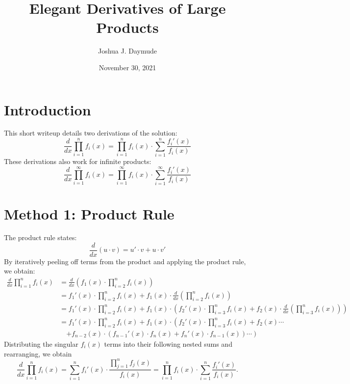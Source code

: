 \documentclass[10pt]{article}
\title{Elegant Derivatives of Large Products}
\author{Joshua J. Daymude}
\date{November 30, 2021}
\begin{document}
\thispagestyle{firststyle}

\maketitle




\section*{Introduction}

This short writeup details two derivations of the solution:
\[\frac{d}{dx}\prod_{i=1}^n f_i(x) = \prod_{i=1}^n f_i(x) \cdot \sum_{i=1}^n \frac{f_i'(x)}{f_i(x)}\]
These derivations also work for infinite products:
\[\frac{d}{dx}\prod_{i=1}^\infty f_i(x) = \prod_{i=1}^\infty f_i(x) \cdot \sum_{i=1}^\infty \frac{f_i'(x)}{f_i(x)}\]




\section*{Method 1: Product Rule}

The product rule states:
\[\frac{d}{dx}(u \cdot v) = u' \cdot v + u \cdot v'\]
By iteratively peeling off terms from the product and applying the product rule, we obtain:
\begin{align*}
    \frac{d}{dx} \prod_{i=1}^n f_i(x) &= \frac{d}{dx} \left(f_1(x) \cdot \prod_{i=2}^n f_i(x)\right) \\
    &= f_1'(x) \cdot \prod_{i=2}^n f_i(x) + f_1(x) \cdot \frac{d}{dx} \left(\prod_{i=2}^n f_i(x)\right) \\
    &= f_1'(x) \cdot \prod_{i=2}^n f_i(x) + f_1(x) \cdot \left(f_2'(x) \cdot \prod_{i=3}^n f_i(x) + f_2(x) \cdot \frac{d}{dx} \left(\prod_{i=3}^n f_i(x)\right)\right) \\
    &= f_1'(x) \cdot \prod_{i=2}^n f_i(x) + f_1(x) \cdot \left(f_2'(x) \cdot \prod_{i=3}^n f_i(x) + f_2(x) \cdots \right. \\
    &\quad \left. + f_{n-2}(x) \cdot \left(f_{n-1}'(x) \cdot f_n(x) + f_n'(x) \cdot f_{n-1}(x)\right) \cdots \right)
\end{align*}
Distributing the singular $f_i(x)$ terms into their following nested sums and rearranging, we obtain
\[\frac{d}{dx} \prod_{i=1}^n f_i(x) = \sum_{i=1}^n f_i'(x) \cdot \frac{\prod_{j=1}^n f_j(x)}{f_i(x)}
= \prod_{i=1}^n f_i(x) \cdot \sum_{i=1}^n \frac{f_i'(x)}{f_i(x)}.\]
\end{document}
